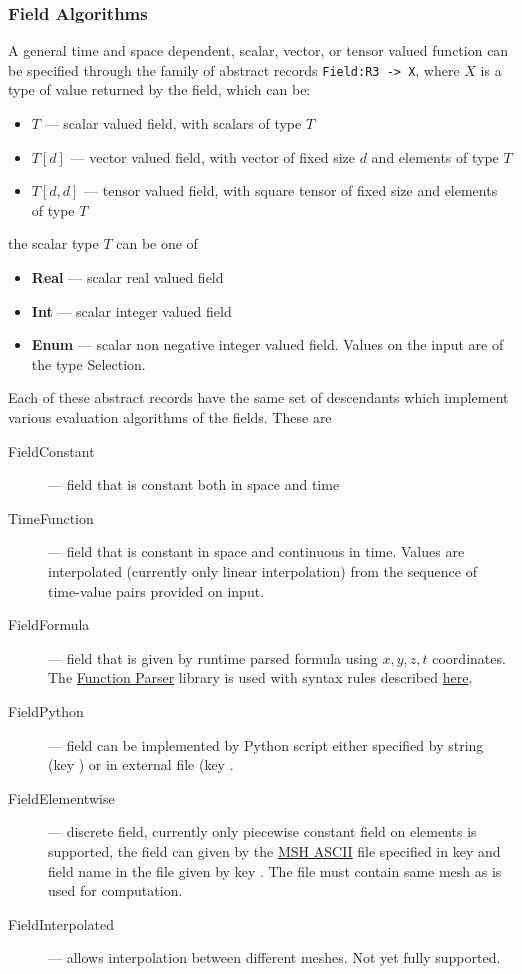 \subsubsection{Field Algorithms}
\label{sec:Fields}
A general time and space dependent, scalar, vector, or  tensor valued function can be specified through the family of abstract records 
\verb'Field:R3 -> X', where $X$ is a type of value returned by the field, which can be:
\begin{itemize}
 \item $T$ --- scalar valued field, with scalars of type $T$
 \item $T[d]$ --- vector valued field, with vector of fixed size $d$ and elements of type $T$
 \item $T[d, d]$ --- tensor valued field, with square tensor of fixed size and elements of type $T$
\end{itemize}
the scalar type $T$ can be one of
\begin{itemize}
 \item {\bf Real} --- scalar real valued field
 \item {\bf Int}  --- scalar integer valued field
 \item {\bf Enum} --- scalar non negative integer valued field. Values on the input are of the type Selection.
\end{itemize}

Each of these abstract records have the same set of descendants which implement various evaluation algorithms of the fields. These are
\begin{description}
 \item[FieldConstant] --- field that is constant both in space and time
 \item[TimeFunction] --- field that is constant in space and continuous in time. Values are interpolated (currently only linear interpolation) from 
 the sequence of time-value pairs provided on input.
 \item[FieldFormula] --- field that is given by runtime parsed formula using $x,y,z,t$ coordinates. The \href{http://warp.povusers.org/FunctionParser/}{Function Parser} library is used
 with syntax rules described \href{http://warp.povusers.org/FunctionParser/fparser.html#literals}{here}.
 \item[FieldPython] --- field can be implemented by Python script either specified by string (key ) 
 or in external file (key . 
 \item[FieldElementwise] --- discrete field, currently only piecewise constant field on elements is supported, the field can given by 
 the \href{http://geuz.org/gmsh/doc/texinfo/gmsh.html#MSH-ASCII-file-format}{MSH ASCII} file specified in key  and field name in the file given 
 by key . The file must contain same mesh as is used for computation.
 \item[FieldInterpolated] --- allows interpolation between different meshes. Not yet fully supported.
\end{description}

